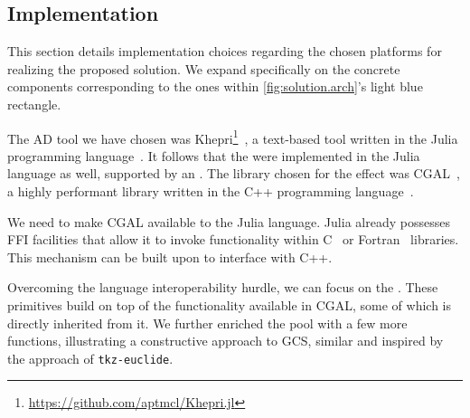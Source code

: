 \subsection{Implementation}%
\label{sec:solution.impl}

This section details implementation choices regarding the chosen platforms for
realizing the proposed solution.  We expand specifically on the concrete
components corresponding to the ones within \cref{fig:solution.arch}'s light
blue rectangle.

The \ac{AD} tool we have chosen was
Khepri\footnote{\url{https://github.com/aptmcl/Khepri.jl}}~\cite{Leitao:2019:GRUGEAV},
a text-based tool written in the Julia programming
language~\cite{Bezanson:2017:JAFANC}.  It follows that the \primitives{} were
implemented in the Julia language as well, supported by an \geomlibrary{}.  The
library chosen for the effect was \ac{CGAL}~\cite{CGAL:5.3:Project}, a highly
performant library written in the C++ programming
language~\cite{Stroustrup:2013:CPP}.

We need to make \ac{CGAL} available to the Julia language.  Julia already
possesses \ac{FFI} facilities that allow it to invoke functionality within
C~\cite{Kernighan:1988:C} or Fortran~\cite{Backus:1957:Fortran} libraries.  This
mechanism can be built upon to interface with C++.

Overcoming the language interoperability hurdle, we can focus on the
\primitives{}.  These primitives build on top of the functionality available in
\ac{CGAL}, some of which is directly inherited from it.  We further enriched the
pool with a few more functions, illustrating a constructive approach to
\ac{GCS}, similar and inspired by the approach of \texttt{tkz-euclide}.




